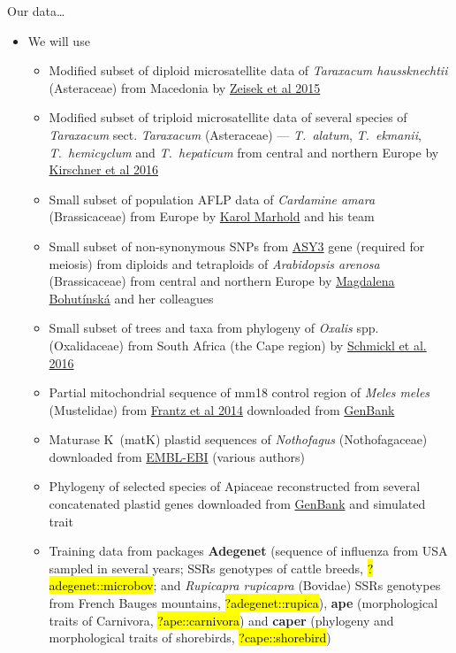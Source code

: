 \documentclass[compress, ucs, xelatex, 11pt, xcolor=svgnames,
	hyperref={
		bookmarks=true,
		unicode=true,
		colorlinks=true,
		pdftitle={Molecular data in R},
		plainpages=false,
		pdfauthor={Vojtech Zeisek},
		pdfsubject={Course about phylogeny and evolution in R},
		pdfcreator={XeLaTeX},
		pdfkeywords={R, evolution, phylogeny, molecular data},
		linkcolor=Tomato,
		anchorcolor=SaddleBrown,
		citecolor=Goldenrod,
		filecolor=DarkMagenta,
		menucolor=Sienna,
		urlcolor=DarkTurquoise,
		pdftex},
	url={hyphens, lowtilde} %
	]{beamer}
\renewcommand{\texttt}[1]{\hl{\ttfamily #1}}
\begin{document}
\begin{frame}[allowframebreaks]{Our data\ldots}
	\begin{itemize}
		\item We will use
		\begin{itemize}
			\item Modified subset of diploid microsatellite data of \textit{Taraxacum haussknechtii} (Asteraceae) from Macedonia by \href{https://trapa.cz/en/taraxacum-section-dioszegia}{Zeisek et al 2015}
			\item Modified subset of triploid microsatellite data of several species of \textit{Taraxacum} sect. \textit{Taraxacum} (Asteraceae) --- \textit{T.~alatum}, \textit{T.~ekmanii}, \textit{T.~hemicyclum} and \textit{T.~hepaticum} from central and northern Europe by \href{https://trapa.cz/en/identif-oligoclonal-agamospermous-microsp}{Kirschner et al 2016}
			\item Small subset of population AFLP data of \textit{Cardamine amara} (Brassicaceae) from Europe by \href{https://botany.natur.cuni.cz/brassiploidy/people}{Karol Marhold} and his team
			\item Small subset of non-synonymous SNPs from \href{https://www.arabidopsis.org/servlets/TairObject?type=locus&name=At2g46980}{ASY3} gene (required for meiosis) from diploids and tetraploids of \textit{Arabidopsis arenosa} (Brassicaceae) from central and northern Europe by \href{https://botany.natur.cuni.cz/ecolgen/people}{Magdalena Bohutínská} and her colleagues
			\item Small subset of trees and taxa from phylogeny of \textit{Oxalis} spp. (Oxalidaceae) from South Africa (the Cape region) by \href{https://onlinelibrary.wiley.com/doi/full/10.1111/1755-0998.12487}{Schmickl et al. 2016}
			\item Partial mitochondrial sequence of mm18 control region of \textit{Meles meles} (Mustelidae) from \href{https://www.nature.com/articles/hdy201445}{Frantz et al 2014} downloaded from \href{https://www.ncbi.nlm.nih.gov/popset/608602125}{GenBank}
			\item Maturase K~(matK) plastid sequences of \textit{Nothofagus} (Nothofagaceae) downloaded from \href{https://www.ebi.ac.uk/}{EMBL-EBI} (various authors)
			\item Phylogeny of selected species of Apiaceae reconstructed from several concatenated plastid genes downloaded from \href{https://www.ncbi.nlm.nih.gov/}{GenBank} and simulated trait
			\item Training data from packages \textbf{Adegenet} (sequence of influenza from USA sampled in several years; SSRs genotypes of cattle breeds, \texttt{?adegenet::microbov}; and \textit{Rupicapra rupicapra} (Bovidae) SSRs genotypes from French Bauges mountains, \texttt{?adegenet::rupica}), \textbf{ape} (morphological traits of Carnivora, \texttt{?ape::carnivora}) and \textbf{caper} (phylogeny and morphological traits of shorebirds, \texttt{?cape::shorebird})

\end{itemize}
\end{itemize}
\end{frame}
\end{document}
